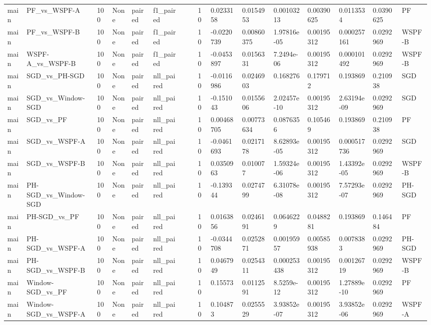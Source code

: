 \begin{tabular}{llllllllllllllll}
main & PF\_vs\_WSPF-A & 100 & None & paired & f1\_paired &  &  & 10 & 0.0233158 & 0.0154953 & 0.00103213 & 0.00390625 & 0.0113534 & 0.0390625 & PF \\
main & PF\_vs\_WSPF-B & 100 & None & paired & f1\_paired &  &  & 10 & -0.0220739 & 0.00860375 & 1.97816e-05 & 0.00195312 & 0.000257161 & 0.0292969 & WSPF-B \\
main & WSPF-A\_vs\_WSPF-B & 100 & None & paired & f1\_paired &  &  & 10 & -0.0453897 & 0.0156331 & 7.2494e-06 & 0.00195312 & 0.000101492 & 0.0292969 & WSPF-B \\
main & SGD\_vs\_PH-SGD & 100 & None & paired & nll\_paired &  &  & 10 & -0.0116986 & 0.0246903 & 0.168276 & 0.179712 & 0.193869 & 0.210938 & SGD \\
main & SGD\_vs\_Window-SGD & 100 & None & paired & nll\_paired &  &  & 10 & -0.151043 & 0.0155606 & 2.02457e-10 & 0.00195312 & 2.63194e-09 & 0.0292969 & SGD \\
main & SGD\_vs\_PF & 100 & None & paired & nll\_paired &  &  & 10 & 0.00468705 & 0.00773634 & 0.0876356 & 0.105469 & 0.193869 & 0.210938 & PF \\
main & SGD\_vs\_WSPF-A & 100 & None & paired & nll\_paired &  &  & 10 & -0.0461693 & 0.0217178 & 8.62893e-05 & 0.00195312 & 0.000517736 & 0.0292969 & SGD \\
main & SGD\_vs\_WSPF-B & 100 & None & paired & nll\_paired &  &  & 10 & 0.0350963 & 0.010077 & 1.59324e-06 & 0.00195312 & 1.43392e-05 & 0.0292969 & WSPF-B \\
main & PH-SGD\_vs\_Window-SGD & 100 & None & paired & nll\_paired &  &  & 10 & -0.139344 & 0.0274799 & 6.31078e-08 & 0.00195312 & 7.57293e-07 & 0.0292969 & PH-SGD \\
main & PH-SGD\_vs\_PF & 100 & None & paired & nll\_paired &  &  & 10 & 0.0163856 & 0.0246191 & 0.0646229 & 0.0488281 & 0.193869 & 0.146484 & PF \\
main & PH-SGD\_vs\_WSPF-A & 100 & None & paired & nll\_paired &  &  & 10 & -0.0344708 & 0.0252871 & 0.00195957 & 0.00585938 & 0.0078383 & 0.0292969 & PH-SGD \\
main & PH-SGD\_vs\_WSPF-B & 100 & None & paired & nll\_paired &  &  & 10 & 0.0467949 & 0.0254311 & 0.000253438 & 0.00195312 & 0.00126719 & 0.0292969 & WSPF-B \\
main & Window-SGD\_vs\_PF & 100 & None & paired & nll\_paired &  &  & 10 & 0.15573 & 0.0112591 & 8.5259e-12 & 0.00195312 & 1.27889e-10 & 0.0292969 & PF \\
main & Window-SGD\_vs\_WSPF-A & 100 & None & paired & nll\_paired &  &  & 10 & 0.104873 & 0.0255529 & 3.93852e-07 & 0.00195312 & 3.93852e-06 & 0.0292969 & WSPF-A \\

\end{tabular}
